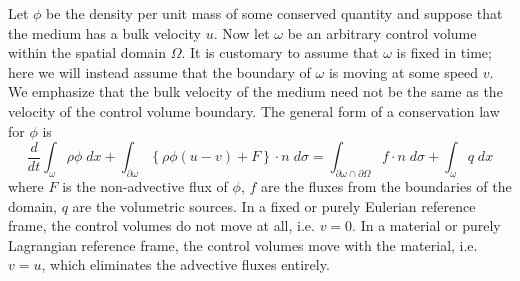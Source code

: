 \documentclass{article}
\theoremstyle{definition}
\theoremstyle{plain}
\begin{document}
Let $\phi$ be the density per unit mass of some conserved quantity and suppose that the medium has a bulk velocity $u$.
Now let $\omega$ be an arbitrary control volume within the spatial domain $\Omega$.
It is customary to assume that $\omega$ is fixed in time; here we will instead assume that the boundary of $\omega$ is moving at some speed $v$.
We emphasize that the bulk velocity of the medium need not be the same as the velocity of the control volume boundary.
The general form of a conservation law for $\phi$ is
\begin{equation}
    \frac{d}{dt}\int_\omega \rho\phi\;dx + \int_{\partial\omega}\left\{\rho\phi (u - v) + F\right\}\cdot n\; d\sigma = \int_{\partial\omega\cap\partial\Omega}f\cdot n\;d\sigma + \int_\omega q\;dx
\end{equation}
where $F$ is the non-advective flux of $\phi$, $f$ are the fluxes from the boundaries of the domain, $q$ are the volumetric sources.
In a fixed or purely Eulerian reference frame, the control volumes do not move at all, i.e. $v = 0$.
In a material or purely Lagrangian reference frame, the control volumes move with the material, i.e. $v = u$, which eliminates the advective fluxes entirely.
\end{document}
